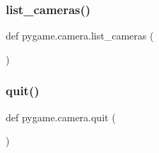 \subsubsection{\texorpdfstring{list\+\_\+cameras()}{list\_cameras()}}
{\footnotesize\ttfamily def pygame.\+camera.\+list\+\_\+cameras (\begin{DoxyParamCaption}{ }\end{DoxyParamCaption})}

\begin{DoxyVerb}\end{DoxyVerb}
 \mbox{\label{namespacepygame_1_1camera_afc39f9eaf33103f88ec2372d1733add1}} 
\subsubsection{\texorpdfstring{quit()}{quit()}}
{\footnotesize\ttfamily def pygame.\+camera.\+quit (\begin{DoxyParamCaption}{ }\end{DoxyParamCaption})}

